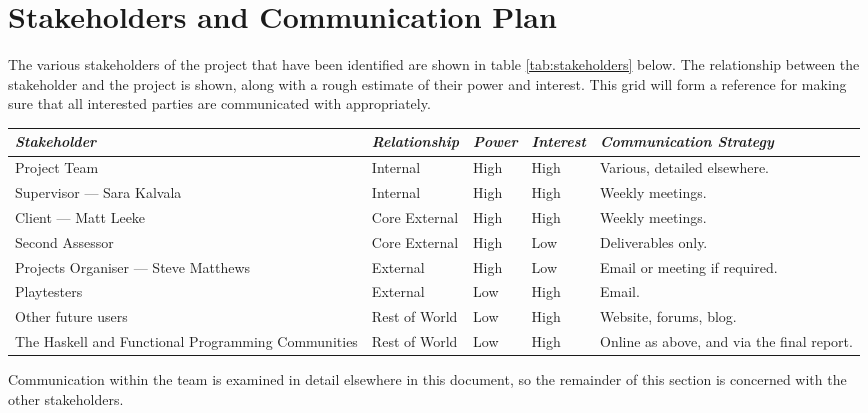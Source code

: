 \section{Stakeholders and Communication Plan}
\label{section:communication}

The various stakeholders of the project that have been identified are shown in table \ref{tab:stakeholders} below. The relationship between the stakeholder and the project is shown, along with a rough estimate of their power and interest. This grid will form a reference for making sure that all interested parties are communicated with appropriately.

\vspace{1em}

\begin{table*}
	\small
	\renewcommand{\arraystretch}{1.2}
	\begin{tabular}{p{20em} p{7em} p{3em} p{3em} p{13em}}
		\toprule
		\emph{Stakeholder} & \emph{Relationship} & \emph{Power} & \emph{Interest} & \emph{Communication Strategy} \\
		\midrule
		
		Project Team & Internal & High & High & 
		 Various, detailed elsewhere. \\
		Supervisor --- Sara Kalvala & Internal & High & High &
		 Weekly meetings. \\
		Client --- Matt Leeke & Core External & High & High &
		 Weekly meetings. \\
		Second Assessor & Core External & High & Low &
		 Deliverables only. \\
		Projects Organiser --- Steve Matthews & External &
		 High & Low & Email or meeting if required. \\
		Playtesters & External & Low & High & Email. \\
		Other future users & Rest of World & Low &
		 High & Website, forums, blog. \\
		The Haskell and Functional Programming Communities & Rest of World & Low &
		 High & Online as above, and via the final report. \\
		\bottomrule
	\end{tabular}
	\vspace{1.5em}
	\caption{Stakeholders for the project.}
	\label{tab:stakeholders}
\end{table*}

\noindent Communication within the team is examined in detail elsewhere in this document, so the remainder of this section is concerned with the other stakeholders.

